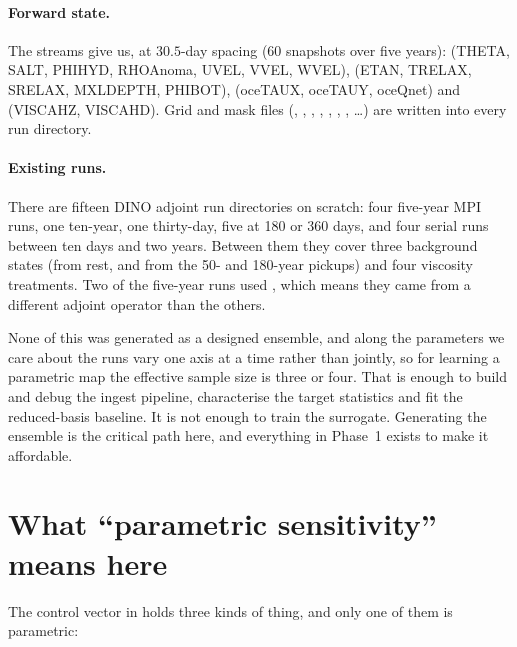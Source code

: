 \paragraph{Forward state.}
The  streams give us, at $30.5$-day spacing ($60$
snapshots over five years):  (THETA, SALT, PHIHYD, RHOAnoma,
UVEL, VVEL, WVEL),  (ETAN, TRELAX, SRELAX, MXLDEPTH, PHIBOT),
 (oceTAUX, oceTAUY, oceQnet) and  (VISCAHZ,
VISCAHD). Grid and mask files (, , ,
, , , , \dots) are written into every run
directory.

\paragraph{Existing runs.}
There are fifteen DINO adjoint run directories on scratch: four five-year MPI
runs, one ten-year, one thirty-day, five at 180 or 360 days, and four serial
runs between ten days and two years. Between them they cover three background
states (from rest, and from the 50- and 180-year pickups) and four viscosity
treatments. Two of the five-year runs used , which means
they came from a different adjoint operator than the others.

None of this was generated as a designed ensemble, and along the parameters we
care about the runs vary one axis at a time rather than jointly, so for
learning a parametric map the effective sample size is three or four. That is
enough to build and debug the ingest pipeline, characterise the target
statistics and fit the reduced-basis baseline. It is not enough to train the
surrogate. Generating the ensemble is the critical path here, and everything in
Phase~1 exists to make it affordable.

\section{What ``parametric sensitivity'' means here}

The control vector in  holds three kinds of thing,
and only one of them is parametric:

